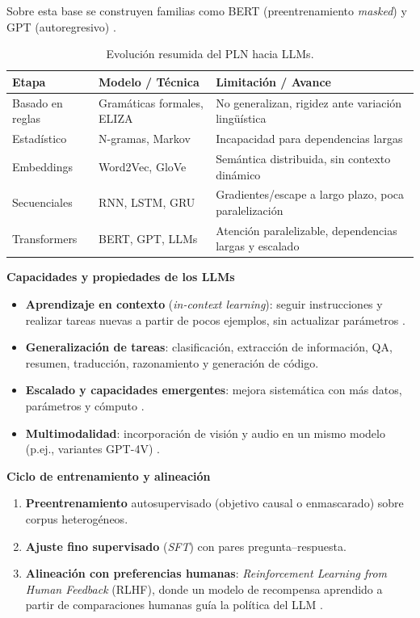 Sobre esta base se construyen familias como BERT (preentrenamiento \textit{masked}) \cite{Devlin2018} y GPT (autoregresivo) \cite{Brown2020}.

\begin{table}[H]
\centering
\begin{tabular}{|p{3cm}|p{4cm}|p{4cm}|}
\hline
\textbf{Etapa} & \textbf{Modelo / Técnica} & \textbf{Limitación / Avance} \\
\hline
Basado en reglas & Gramáticas formales, ELIZA & No generalizan, rigidez ante variación lingüística \\
\hline
Estadístico & N-gramas, Markov & Incapacidad para dependencias largas \\
\hline
Embeddings & Word2Vec, GloVe & Semántica distribuida, sin contexto dinámico \\
\hline
Secuenciales & RNN, LSTM, GRU & Gradientes/escape a largo plazo, poca paralelización \\
\hline
Transformers & BERT, GPT, LLMs & Atención paralelizable, dependencias largas y escalado \\
\hline
\end{tabular}
\caption{Evolución resumida del PLN hacia LLMs.}
\end{table}

\vspace{0.3cm}
\textbf{Capacidades y propiedades de los LLMs} 
\begin{itemize}
    \item \textbf{Aprendizaje en contexto} (\textit{in-context learning}): seguir instrucciones y realizar tareas nuevas a partir de pocos ejemplos, sin actualizar parámetros \cite{Brown2020}.
    \item \textbf{Generalización de tareas}: clasificación, extracción de información, QA, resumen, traducción, razonamiento y generación de código.
    \item \textbf{Escalado y capacidades emergentes}: mejora sistemática con más datos, parámetros y cómputo \cite{Kaplan2020,Hoffmann2022}.
    \item \textbf{Multimodalidad}: incorporación de visión y audio en un mismo modelo (p.ej., variantes GPT-4V) \cite{OpenAI2023}.
\end{itemize}

\vspace{0.3cm}
\textbf{Ciclo de entrenamiento y alineación} 
\begin{enumerate}
    \item \textbf{Preentrenamiento} autosupervisado (objetivo causal o enmascarado) sobre corpus heterogéneos.
    \item \textbf{Ajuste fino supervisado} (\textit{SFT}) con pares pregunta–respuesta.
    \item \textbf{Alineación con preferencias humanas}: \textit{Reinforcement Learning from Human Feedback} (RLHF), donde un modelo de recompensa aprendido a partir de comparaciones humanas guía la política del LLM \cite{Ouyang2022}.
\end{enumerate}

